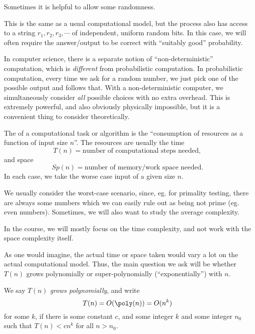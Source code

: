 \documentclass[a4paper]{article}
\begin{document}
Sometimes it is helpful to allow some randomness.
\begin{defi}
  This is the same as a usual computational model, but the process also has access to a string $r_1, r_2, r_3, \cdots$ of independent, uniform random bits. In this case, we will often require the answer/output to be correct with ``suitably good'' probability.
\end{defi}

In computer science, there is a separate notion of ``non-deterministic'' computation, which is \emph{different} from probabilistic computation. In probabilistic computation, every time we ask for a random number, we just pick one of the possible output and follows that. With a non-deterministic computer, we simultaneously consider \emph{all} possible choices with no extra overhead. This is extremely powerful, and also obviously physically impossible, but it is a convenient thing to consider theoretically.

\begin{defi}
  The  of a computational task or algorithm is the ``consumption of resources as a function of input size $n$''. The resources are usually the time
  \[
    T(n) = \text{number of computational steps needed},
  \]
  and space
  \[
    Sp(n) = \text{number of memory/work space needed}.
  \]
  In each case, we take the worse case input of a given size $n$.
\end{defi}
We usually consider the worst-case scenario, since, eg. for primality testing, there are always some numbers which we can easily rule out as being not prime (eg. even numbers). Sometimes, we will also want to study the average complexity.

In the course, we will mostly focus on the time complexity, and not work with the space complexity itself.

As one would imagine, the actual time or space taken would vary a lot on the actual computational model. Thus, the main question we ask will be whether $T(n)$ grows polynomially or super-polynomially (``exponentially'') with $n$.
\begin{defi}
  We say $T(n)$ \emph{grows polynomially}, and write
  \[
    T(n) = O(\poly(n)) = O(n^k)
  \]
  for some $k$, if there is some constant $c$, and some integer $k$ and some integer $n_0$ such that $T(n) < c n^k$ for all $n > n_0$.
\end{defi}
\end{document}
